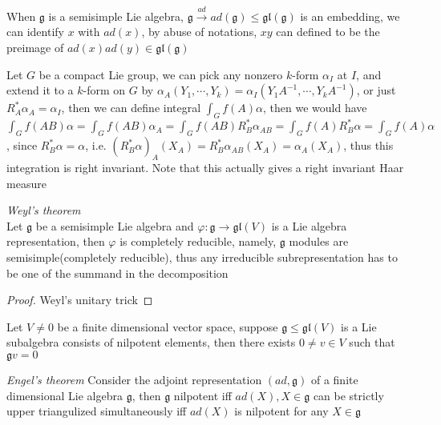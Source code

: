 \documentclass[main]{subfiles}
\begin{document}
\begin{remark}
When $\mathfrak{g}$ is a semisimple Lie algebra, $\mathfrak{g}\xrightarrow{ad}ad(\mathfrak{g})\leq\mathfrak{gl}(\mathfrak{g})$ is an embedding, we can identify $x$ with $ad(x)$, by abuse of notations, $xy$ can defined to be the preimage of $ad(x)ad(y)\in\mathfrak{gl}(\mathfrak{g})$
\end{remark}

\begin{lemma}
Let $G$ be a compact Lie group, we can pick any nonzero $k$-form $\alpha_I$ at $I$, and extend it to a $k$-form on $G$ by $\alpha_A(Y_1,\cdots,Y_k)=\alpha_I(Y_1A^{-1},\cdots,Y_kA^{-1})$, or just $R_A^*\alpha_A=\alpha_I$, then we can define integral $\displaystyle\int_G f(A)\alpha$, then we would have $\displaystyle\int_G f(AB)\alpha=\int_G f(AB)\alpha_A=\int_G f(AB)R_B^*\alpha_{AB}=\int_G f(A)R_B^*\alpha=\int_G f(A)\alpha$, since $R_B^*\alpha=\alpha$, i.e. $(R_B^*\alpha)_A(X_A)=R_B^*\alpha_{AB}(X_A)=\alpha_A(X_A)$, thus this integration is right invariant. Note that this actually gives a right invariant Haar measure
\end{lemma}

\begin{theorem}\textit{Weyl's theorem}\label{Weyl's theorem} \\
Let $\mathfrak{g}$ be a semisimple Lie algebra and $\varphi:\mathfrak{g}\to\mathfrak{gl}(V)$ is a Lie algebra representation, then $\varphi$ is completely reducible, namely, $\mathfrak{g}$ modules are semisimple(completely reducible), thus any irreducible subrepresentation has to be one of the summand in the decomposition
\end{theorem}

\begin{proof}
Weyl's unitary trick
\end{proof}

\begin{lemma}\label{Lemma for Engel's theorem}
Let $V\neq0$ be a finite dimensional vector space, suppose $\mathfrak{g}\leq\mathfrak{gl}(V)$ is a Lie subalgebra consists of nilpotent elements, then there exists $0\neq v\in V$ such that $\mathfrak{g}v=0$
\end{lemma}

\begin{theorem}\textit{Engel's theorem}\label{Engel's theorem}
Consider the adjoint representation $(ad,\mathfrak{g})$ of a finite dimensional Lie algebra $\mathfrak{g}$, then $\mathfrak{g}$ nilpotent iff $ad(X),X\in\mathfrak{g}$ can be strictly upper triangulized simultaneously iff $ad(X)$ is nilpotent for any $X\in\mathfrak{g}$
\end{theorem}
\end{document}
